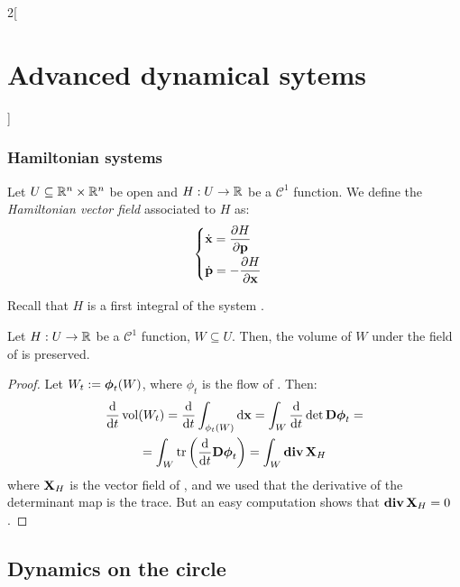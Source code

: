 \documentclass[../../../main_math.tex]{subfiles}
\begin{document}
\begin{multicols}{2}[\section{Advanced dynamical sytems}]
  \subsubsection{Hamiltonian systems}
  \begin{definition}
    Let $U\subseteq \mathbb{R}^n\times \mathbb{R}^n$ be open and $H:U\rightarrow \mathbb{R}$ be a $\mathcal{C}^1$ function. We define the \emph{Hamiltonian vector field} associated to $H$ as:
    \begin{equation}\label{ADS:ham_system}
      \begin{cases}
        \displaystyle\dot{\vf{x}}=\pdv{H}{\vf{p}}\vspace{0.1cm} \\
        \displaystyle\dot{\vf{p}}=-\pdv{H}{\vf{x}}
      \end{cases}
    \end{equation}
  \end{definition}
  \begin{remark}
    Recall that $H$ is a first integral of the system .
  \end{remark}
  \begin{lemma}
    Let $H:U\rightarrow \mathbb{R}$ be a $\mathcal{C}^1$ function, $W\subseteq U$. Then, the volume of $W$ under the field of  is preserved.
  \end{lemma}
  \begin{proof}
    Let $W_t:=\boldsymbol{\mathrm{\phi}}_t(W)$, where $\phi_t$ is the flow of . Then:
    \begin{multline*}
      \dv{}{t}\vol(W_t)=\dv{}{t}\int_{\phi_t(W)}\dd{\vf{x}}=\int_W\dv{}{t}\det \vf{D\phi}_t=\\
      =\int_W\trace\left(\dv{}{t}\vf{D\phi}_t\right)=\int_W\div \vf{X}_H
    \end{multline*}
    where $\boldsymbol{\mathrm{X}}_H$ is the vector field of , and  we used that the derivative of the determinant map is the trace. But an easy computation shows that $\operatorname{\boldsymbol{\mathrm{div}}} \boldsymbol{\mathrm{X}}_H=0$.
  \end{proof}
  \subsection{Dynamics on the circle}

\end{multicols}
\end{document}
